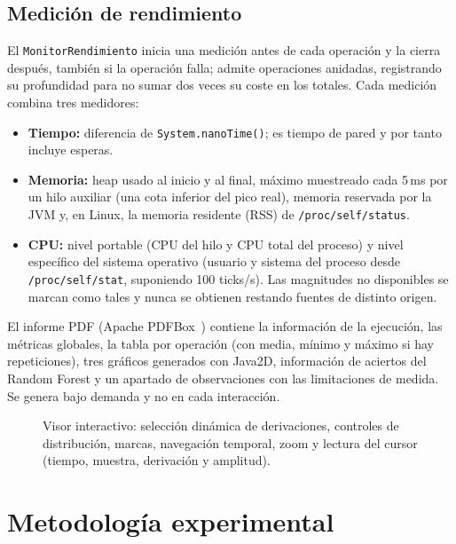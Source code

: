 \subsection{Medición de rendimiento}
\label{sec:rend}
El \texttt{MonitorRendimiento} inicia una medición antes de cada operación y la cierra después, también si la operación falla; admite operaciones anidadas, registrando su profundidad para no sumar dos veces su coste en los totales. Cada medición combina tres medidores:
\begin{itemize}
  \item \textbf{Tiempo:} diferencia de \texttt{System.nanoTime()}; es tiempo de pared y por tanto incluye esperas.
  \item \textbf{Memoria:} heap usado al inicio y al final, máximo muestreado cada 5\,ms por un hilo auxiliar (una cota inferior del pico real), memoria reservada por la JVM y, en Linux, la memoria residente (RSS) de \texttt{/proc/self/status}.
  \item \textbf{CPU:} nivel portable (CPU del hilo y CPU total del proceso) y nivel específico del sistema operativo (usuario y sistema del proceso desde \texttt{/proc/self/stat}, suponiendo 100 ticks/s). Las magnitudes no disponibles se marcan como tales y nunca se obtienen restando fuentes de distinto origen.
\end{itemize}
El informe PDF (Apache PDFBox~\cite{pdfbox}) contiene la información de la ejecución, las métricas globales, la tabla por operación (con media, mínimo y máximo si hay repeticiones), tres gráficos generados con Java2D, información de aciertos del Random Forest y un apartado de observaciones con las limitaciones de medida. Se genera bajo demanda y no en cada interacción.
\begin{figure}[t]
\centering
\caption{Visor interactivo: selección dinámica de derivaciones, controles de distribución, marcas, navegación temporal, zoom y lectura del cursor (tiempo, muestra, derivación y amplitud).}
\label{fig:gui}
\end{figure}

\section{Metodología experimental}


